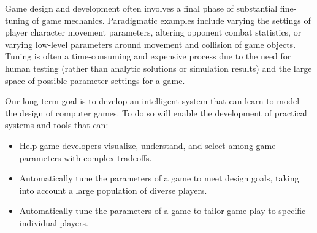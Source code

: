 \documentclass{sig-alternate}
\begin{document}
Game design and development often involves a final phase of substantial fine-tuning of game mechanics. Paradigmatic examples include varying the settings of player character movement parameters, altering opponent combat statistics, or varying low-level parameters around movement and collision of game objects. Tuning is often a time-consuming and expensive process due to the need for human testing (rather than analytic solutions or simulation results) and the large space of possible parameter settings for a game.

Our long term goal is to develop an intelligent system that can learn to model the design of computer games.
To do so will enable the development of practical systems and tools that can:

\begin{itemize}
\item Help game developers visualize, understand, and select among game parameters with complex tradeoffs.
\item Automatically tune the parameters of a game to meet design goals, taking into account a large population of diverse players.
\item Automatically tune the parameters of a game to tailor game play to specific individual players.
\end{itemize}
\end{document}

